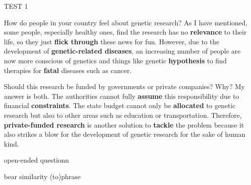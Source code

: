 \begin{glossarymc}[Cambridge 6]
\begin{test}{TEST 1}
    \begin{qa}{How do people in your country feel about genetic research?}
    As I have mentioned, some people, especially healthy ones, find the research has no \textbf{relevance} to their life, so they just \textbf{flick through} these news for fun. However, due to the development of \textbf{genetic-related diseases}, an increasing number of people are now more conscious of genetics and things like genetic \textbf{hypothesis} to find therapies for \textbf{fatal} diseases such as cancer.
    \end{qa}

    \begin{qa}{Should this research be funded by governments or private companies? Why?}
    My answer is both. The authorities cannot fully \textbf{assume} this responsibility due to financial \textbf{constraints}. The state budget cannot only be \textbf{allocated} to genetic research but also to other areas such as education or transportation. Therefore, \textbf{private-funded research} is another solution to \textbf{tackle} the problem because it also strikes a blow for the development of genetic research for the sake of human kind.
    \end{qa}

        \begin{VocabExplain}[Part 3]
            \begin{ExplainCard}{open-ended question}{n}
            \end{ExplainCard}

            \begin{ExplainCard}{bear similarity (to)}{phrase}
        \end{ExplainCard}


\end{VocabExplain}
\end{test}
\end{glossarymc}
